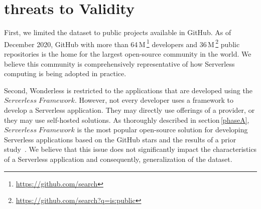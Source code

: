 \section{threats to Validity}
\label{limitations}

%

First, we limited the dataset to public projects available in GitHub. As of December 2020, 
GitHub with more than 64\,M\,\footnote{\url{https://github.com/search}} 
developers and 36\,M\,\footnote{\url{https://github.com/search?q=is:public}} public 
repositories is the home for the largest open-source community in the world. 
We believe this community is comprehensively representative of how Serverless 
computing is being adopted in practice.
%

Second, Wonderless is restricted to the applications 
that are developed using the $Serverless \; Framework$. 
However, not every developer uses a framework to develop a Serverless application. 
They may directly use offerings of a provider, or they may use self-hosted solutions. 
%
As thoroughly 
described in section\,\ref{phaseA}, $Serverless \; Framework$ is the 
most popular open-source solution for developing Serverless applications 
based on the GitHub stars and the results of a prior study~\cite{kritikos2018review}. 
We believe that this issue does not significantly impact the characteristics of a 
Serverless application and consequently, generalization of the dataset.












